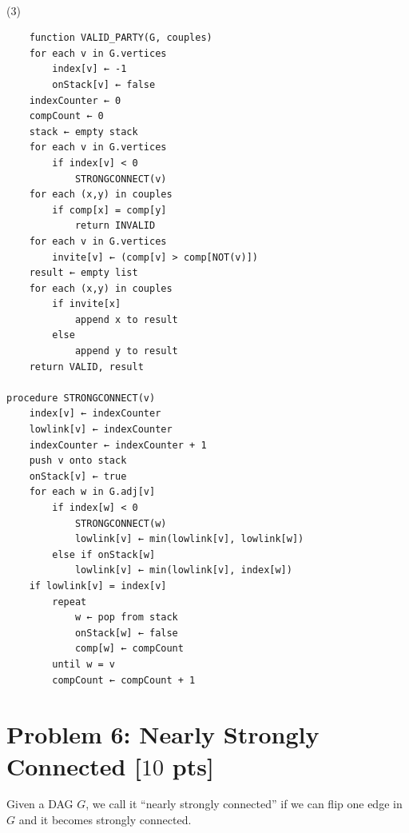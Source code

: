\documentclass[letterpaper, 11pt]{article}
\newcommand{\1}{\mathds{1}}	%
\theoremstyle{definition}
\newcommand{\problem}[1]{\section*{Problem #1}}
\newenvironment{solution}{{\par\noindent\it Solution.}}{}
\begin{document}
\begin{solution}
\\(3)
\begin{lstlisting}
    function VALID_PARTY(G, couples)
    for each v in G.vertices
        index[v] ← -1
        onStack[v] ← false
    indexCounter ← 0
    compCount ← 0
    stack ← empty stack
    for each v in G.vertices
        if index[v] < 0
            STRONGCONNECT(v)
    for each (x,y) in couples
        if comp[x] = comp[y]
            return INVALID
    for each v in G.vertices
        invite[v] ← (comp[v] > comp[NOT(v)])
    result ← empty list
    for each (x,y) in couples
        if invite[x]
            append x to result
        else
            append y to result
    return VALID, result

procedure STRONGCONNECT(v)
    index[v] ← indexCounter
    lowlink[v] ← indexCounter
    indexCounter ← indexCounter + 1
    push v onto stack
    onStack[v] ← true
    for each w in G.adj[v]
        if index[w] < 0
            STRONGCONNECT(w)
            lowlink[v] ← min(lowlink[v], lowlink[w])
        else if onStack[w]
            lowlink[v] ← min(lowlink[v], index[w])
    if lowlink[v] = index[v]
        repeat
            w ← pop from stack
            onStack[w] ← false
            comp[w] ← compCount
        until w = v
        compCount ← compCount + 1
\end{lstlisting}
\end{solution}
\clearpage



\problem{6: Nearly Strongly Connected [$10$ pts]}
Given a DAG $G$, we call it ``nearly strongly connected'' if we can flip one edge in $G$ and it becomes strongly connected.
\end{document}
